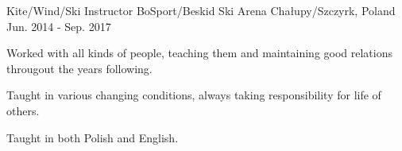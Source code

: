 \begin{cventries}
  \cventry
    {Kite/Wind/Ski Instructor} %
    {BoSport/Beskid Ski Arena} %
    {Chałupy/Szczyrk, Poland} %
    {Jun. 2014 - Sep. 2017} %
    {
      \begin{cvitems} %
        \item {Worked with all kinds of people, teaching them and maintaining good relations througout the years following.}
        \item {Taught in various changing conditions, always taking responsibility for life of others.}
        \item {Taught in both Polish and English.}
      \end{cvitems}
    }

\end{cventries}
